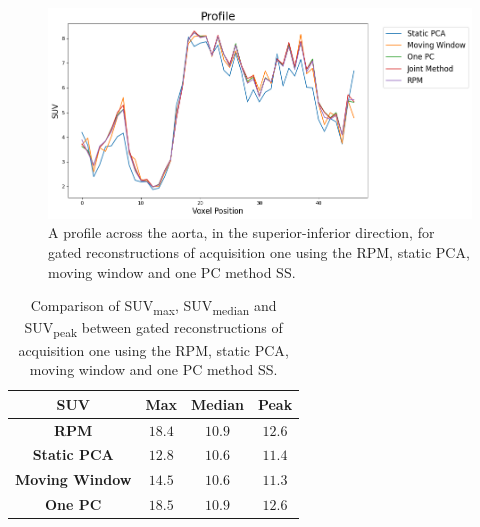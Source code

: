             \begin{figure}
                \centering
                
                \includegraphics[width=1.0\linewidth]{figures/data_driven_surrogate_signal_extraction_results_1_profile_pca.png}
                
                \captionsetup{singlelinecheck=false, justification=centering}
                \caption{A profile across the aorta, in the superior-inferior direction, for gated reconstructions of acquisition one using the \gls{RPM}, static \gls{PCA}, moving window and one \gls{PC} method \gls{SS}.}
                \label{fig:pca_data_driven_surrogate_signal_extraction_methods_for_Dynamic_pet_profile}
            \end{figure}
            
            \begin{table}
                \centering
                
                \captionsetup{singlelinecheck=false, justification=centering}
                \caption{Comparison of \gls{SUV}\textsubscript{max}, \gls{SUV}\textsubscript{median} and \gls{SUV}\textsubscript{peak} between gated reconstructions of acquisition one using the \gls{RPM}, static \gls{PCA}, moving window and one \gls{PC} method \gls{SS}.}
                
                \resizebox*{0.75\linewidth}{!}
                {
                    \begin{tabular}{||c|ccc||}
                        \hline
                        \textbf{\gls{SUV}} & \textbf{Max} & \textbf{Median} & \textbf{Peak} \\
                        \hline
                        \textbf{\gls{RPM}}          & $18.4$ & $10.9$ & $12.6$ \\
                        \hline
                        \textbf{Static \gls{PCA}}   & $12.8$ & $10.6$ & $11.4$ \\
                        \textbf{Moving Window}      & $14.5$ & $10.6$ & $11.3$ \\
                        \textbf{One \gls{PC}}       & $18.5$ & $10.9$ & $12.6$ \\
                        \hline
                    \end{tabular}
                }
                \label{tab:pca_data_driven_surrogate_signal_extraction_methods_for_Dynamic_pet_suv}
            \end{table}
            
